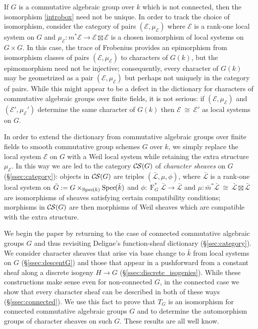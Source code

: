 \documentclass[10pt]{amsart}
\theoremstyle{plain}
\theoremstyle{definition}
\theoremstyle{remark}
\newcommand{\bFq}{\bar{k}}
\newcommand{\Fq}{k}
\newcommand{\Frob}[1]{\operatorname{F}_{#1}}
\newcommand{\Spec}[1]{{\operatorname{Spec}\hskip-1pt( #1 )}}
\newcommand{\iso}{{\ \cong\ }}
\newcommand{\TrFrob}[1]{T_{#1}}
\newcommand{\cs}[1]{{\mathcal{#1}}}
\newcommand{\gcs}[1]{{\mathcal{\bar #1}}}
\newcommand{\CS}{{\mathcal{C\hskip-0.8pt S}}}
\begin{document}
If $G$ is a commutative algebraic group over $\Fq$ which is not connected, then the isomorphism \eqref{introbox} need not be unique. In order to track the choice of isomorphism, consider the category of pairs $(\cs{E},\mu_\cs{E})$ where $\cs{E}$ is a rank-one local system on $G$ and $\mu_\cs{E} : m^*\cs{E} \to \cs{E}\boxtimes\cs{E}$ is a chosen isomorphism of local systems on $G\times G$. 
In this case, the trace of Frobenius provides an epimorphism from isomorphism classes of pairs $(\cs{E},\mu_\cs{E})$ to characters of $G(\Fq)$, but the epimomorphism need not be injective; consequently,
every character of $G(\Fq)$ may be geometrized as a pair $(\cs{E},\mu_\cs{E})$ but perhaps not uniquely in the category of pairs. 
While this might appear to be a defect in the dictionary for characters of commutative algebraic groups over finite fields, it is not serious: if $(\cs{E},\mu_\cs{E})$ and $(\cs{E}',\mu_\cs{E}')$ determine the same character of $G(\Fq)$ then $\cs{E}\iso \cs{E}'$ as local systems on $G$.

In order to extend the dictionary from commutative algebraic groups over finite fields to smooth commutative group schemes $G$ over $\Fq$,
we simply replace the local system $\cs{E}$ on $G$ with a Weil local system while retaining the extra structure $\mu_\cs{E}$. 
In this way we are led to the category $\CS(G)$ of {\it character sheaves} on $G$ (\S\ref{ssec:category}):
objects in $\CS(G)$ are triples $(\gcs{L}, \mu,\phi)$, where $\gcs{L}$ is a rank-one local system on ${\bar G} := G\times_{\Spec{\Fq}} \Spec{\bFq}$
and $\phi : \Frob{G}^* \gcs{L}\to \gcs{L}$ and $\mu : {\bar m}^* \gcs{L} \iso \gcs{L} \boxtimes \gcs{L}$ are isomorphisms of sheaves satisfying certain compatibility conditions;
morphisms in $\CS(G)$ are then morphisms of Weil sheaves which are compatible with the extra structure.

We begin the paper by returning to the case of connected commutative algebraic groups $G$ and thus revisiting Deligne's function-sheaf dictionary (\S\ref{sec:category}).
We consider character sheaves that arise via base change to $\bFq$ from local systems on $G$ (\S\ref{ssec:descentG}) and
those that appear in a pushforward from a constant sheaf along a discrete isogeny $H \to G$ (\S\ref{ssec:discrete_isogenies}).  
While these constructions make sense even for non-connected $G$, in the connected case we show that every character sheaf can be described in both of these ways (\S\ref{ssec:connected}).  
We use this fact to prove that $\TrFrob{G}$ is an isomorphism for connected commutative algebraic groups $G$
and to determine the automorphism groups of character sheaves on such $G$. 
These results are all well know.
\end{document}
